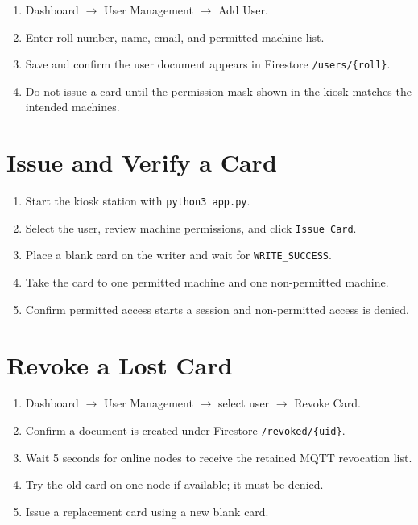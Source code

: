 \begin{enumerate}[leftmargin=1.5em]
    \item Dashboard $\rightarrow$ User Management $\rightarrow$ Add User.
    \item Enter roll number, name, email, and permitted machine list.
    \item Save and confirm the user document appears in Firestore \texttt{/users/\{roll\}}.
    \item Do not issue a card until the permission mask shown in the kiosk matches the intended machines.
\end{enumerate}

\section{Issue and Verify a Card}

\begin{enumerate}[leftmargin=1.5em]
    \item Start the kiosk station with \texttt{python3 app.py}.
    \item Select the user, review machine permissions, and click \texttt{Issue Card}.
    \item Place a blank card on the writer and wait for \texttt{WRITE\_SUCCESS}.
    \item Take the card to one permitted machine and one non-permitted machine.
    \item Confirm permitted access starts a session and non-permitted access is denied.
\end{enumerate}

\section{Revoke a Lost Card}

\begin{enumerate}[leftmargin=1.5em]
    \item Dashboard $\rightarrow$ User Management $\rightarrow$ select user $\rightarrow$ Revoke Card.
    \item Confirm a document is created under Firestore \texttt{/revoked/\{uid\}}.
    \item Wait 5 seconds for online nodes to receive the retained MQTT revocation list.
    \item Try the old card on one node if available; it must be denied.
    \item Issue a replacement card using a new blank card.
\end{enumerate}

